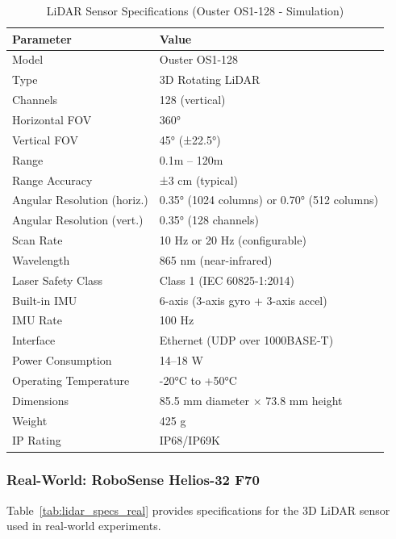 \begin{table}[htbp]
\centering
\caption{LiDAR Sensor Specifications (Ouster OS1-128 - Simulation)}
\label{tab:lidar_specs_sim}
\begin{tabular}{@{}ll@{}}
\toprule
\textbf{Parameter} & \textbf{Value} \\
\midrule
Model & Ouster OS1-128 \\
Type & 3D Rotating LiDAR \\
Channels & 128 (vertical) \\
Horizontal FOV & 360° \\
Vertical FOV & 45° (±22.5°) \\
Range & 0.1m -- 120m \\
Range Accuracy & ±3 cm (typical) \\
Angular Resolution (horiz.) & 0.35° (1024 columns) or 0.70° (512 columns) \\
Angular Resolution (vert.) & 0.35° (128 channels) \\
Scan Rate & 10 Hz or 20 Hz (configurable) \\
Wavelength & 865 nm (near-infrared) \\
Laser Safety Class & Class 1 (IEC 60825-1:2014) \\
Built-in IMU & 6-axis (3-axis gyro + 3-axis accel) \\
IMU Rate & 100 Hz \\
Interface & Ethernet (UDP over 1000BASE-T) \\
Power Consumption & 14--18 W \\
Operating Temperature & -20°C to +50°C \\
Dimensions & 85.5 mm diameter × 73.8 mm height \\
Weight & 425 g \\
IP Rating & IP68/IP69K \\
\bottomrule
\end{tabular}
\end{table}

\subsubsection{Real-World: RoboSense Helios-32 F70}

Table~\ref{tab:lidar_specs_real} provides specifications for the 3D LiDAR sensor used in real-world experiments.


